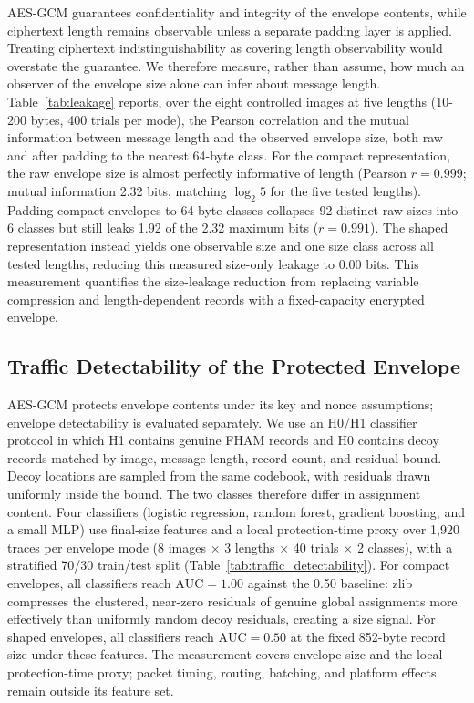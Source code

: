 \documentclass[preprint,12pt]{elsarticle}
\theoremstyle{plain}
\begin{document}
AES-GCM guarantees confidentiality and integrity of the envelope contents,
while ciphertext length remains observable unless a separate padding layer is
applied. Treating ciphertext indistinguishability as covering length
observability would overstate the guarantee. We therefore
measure, rather than assume, how much an observer of the envelope size alone
can infer about message length. Table~\ref{tab:leakage} reports, over the
eight controlled images at five lengths (10-200 bytes, 400 trials per mode),
the Pearson correlation and the mutual information between message length and
the observed envelope size, both raw and after padding to the nearest
64-byte class. For the compact representation, the raw envelope size is almost
perfectly informative of length (Pearson $r=0.999$; mutual information
2.32 bits, matching $\log_2 5$ for the five tested lengths). Padding compact
envelopes to 64-byte classes collapses 92 distinct raw sizes into 6 classes
but still leaks 1.92 of the 2.32 maximum bits ($r=0.991$). The shaped
representation instead yields one observable size and one size class across
all tested lengths, reducing this measured size-only leakage to 0.00 bits.
This measurement quantifies the size-leakage reduction from replacing
variable compression and length-dependent records with a fixed-capacity
encrypted envelope.

\begin{table}[!t]
\centering
\caption{Message-Length Leakage Through Envelope Size (64-Byte Padding Classes)}
\label{tab:leakage}
{\small\setlength{\tabcolsep}{4pt}}
\end{table}

\subsection{Traffic Detectability of the Protected Envelope}

AES-GCM protects envelope contents under its key and nonce assumptions;
envelope detectability is evaluated separately. We use an H0/H1 classifier
protocol in which H1 contains genuine FHAM records and H0 contains decoy
records matched by image, message length, record count, and residual bound.
Decoy locations are sampled from the same codebook, with residuals drawn
uniformly inside the bound. The two classes therefore differ in assignment
content. Four classifiers (logistic regression, random forest, gradient
boosting, and a small MLP) use final-size features and a local protection-time
proxy over 1,920 traces per envelope mode (8 images $\times$ 3 lengths
$\times$ 40 trials $\times$ 2 classes), with a stratified 70/30 train/test
split (Table~\ref{tab:traffic_detectability}). For compact envelopes, all
classifiers reach $\mathrm{AUC}=1.00$ against the 0.50 baseline: zlib
compresses the clustered, near-zero residuals of genuine global assignments
more effectively than uniformly random decoy residuals, creating a size
signal. For shaped envelopes, all classifiers reach $\mathrm{AUC}=0.50$ at
the fixed 852-byte record size under these features. The measurement covers
envelope size and the local protection-time proxy; packet timing, routing,
batching, and platform effects remain outside its feature set.
\end{document}
